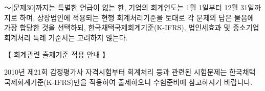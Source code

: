 \begin{framedtext}
[문제1]～[문제30]까지는 특별한 언급이 없는 한, 기업의 회계연도는 1월 1일부터 12월 31일까지로 하며, 상장법인에 적용되는 현행 회계처리기준을 토대로 각 문제의 답은 물음에 가장 합당한 것을 선택하되, 한국채택국제회계기준(K-IFRS), 법인세효과 및 중소기업회계처리 특례 기준서는 고려하지 않는다. \par
\end{framedtext}
\begin{framedtext}
\centerline{【 회계관련 출제기준 적용 안내 】}
2010년 제21회 감정평가사 자격시험부터 회계처리 등과 관련된 시험문제는 한국채택국제회계기준(K-IFRS)만을 적용하여 출제하오니 수험준비에 참고하시기 바랍니다. \par
\end{framedtext}
